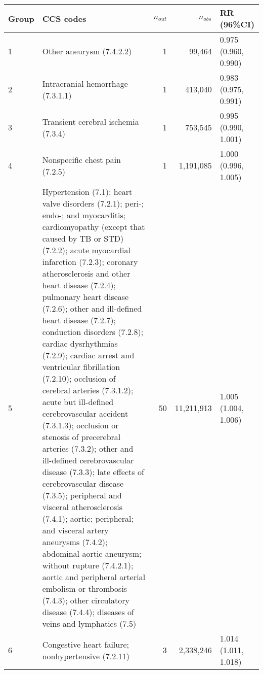 \begin{tabular}{lp{6.5cm}rrp{2.2cm}}
  \hline
Group & CCS codes & $n_{out}$ & $n_{obs}$ & RR (96\%CI) \\ 
  \hline
   1 & Other aneurysm (7.4.2.2) &    1 & 99,464 & 0.975 (0.960, 0.990) \\ 
     2 & Intracranial hemorrhage (7.3.1.1) &    1 & 413,040 & 0.983 (0.975, 0.991) \\ 
     3 & Transient cerebral ischemia (7.3.4) &    1 & 753,545 & 0.995 (0.990, 1.001) \\ 
     4 & Nonspecific chest pain (7.2.5) &    1 & 1,191,085 & 1.000 (0.996, 1.005) \\ 
     5 & Hypertension (7.1); heart valve disorders (7.2.1); peri-; endo-; and myocarditis; cardiomyopathy (except that caused by TB or STD) (7.2.2); acute myocardial infarction (7.2.3); coronary atherosclerosis and other heart disease (7.2.4); pulmonary heart disease (7.2.6); other and ill-defined heart disease (7.2.7); conduction disorders (7.2.8); cardiac dysrhythmias (7.2.9); cardiac arrest and ventricular fibrillation (7.2.10); occlusion of cerebral arteries (7.3.1.2); acute but ill-defined cerebrovascular accident (7.3.1.3); occlusion or stenosis of precerebral arteries (7.3.2); other and ill-defined cerebrovascular disease (7.3.3); late effects of cerebrovascular disease (7.3.5); peripheral and visceral atherosclerosis (7.4.1); aortic; peripheral; and visceral artery aneurysms (7.4.2); abdominal aortic aneurysm; without rupture (7.4.2.1); aortic and peripheral arterial embolism or thrombosis (7.4.3); other circulatory disease (7.4.4); diseases of veins and lymphatics (7.5) &   50 & 11,211,913 & 1.005 (1.004, 1.006) \\ 
     6 & Congestive heart failure; nonhypertensive (7.2.11) &    3 & 2,338,246 & 1.014 (1.011, 1.018) \\ 
   \hline
\end{tabular}

